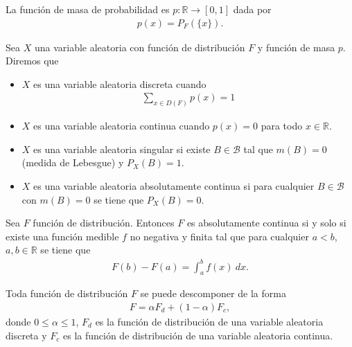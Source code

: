 \begin{defi}
    La función de masa de probabilidad es $p: \mathbb{R} \longrightarrow [0,1]$ dada por
    \begin{align*}
        p(x) = P_F(\{x\}).
    \end{align*}
\end{defi}

\begin{defi}
    Sea $X$ una variable aleatoria con función de distribución $F$ y función de masa $p$. Diremos que
    \begin{itemize}
        \item $X$ es una variable aleatoria discreta cuando
              \begin{align*}
                  \sum_{x \in D(F)} p(x) = 1
              \end{align*}
        \item $X$ es una variable aleatoria continua cuando $p(x) = 0$ para todo $x \in \mathbb{R}$.
        \item $X$ es una variable aleatoria singular si existe $B \in \mathcal{B}$ tal que $m(B) = 0$ (medida de Lebesgue) y $P_X(B) = 1$.
        \item $X$ es una variable aleatoria absolutamente continua si para cualquier $B \in \mathcal{B}$ con $m(B) = 0$ se tiene que $P_X(B) = 0$.
    \end{itemize}
\end{defi}

\begin{teo}
    Sea $F$ función de distribución. Entonces $F$ es absolutamente continua si y solo si existe una función medible $f$ no negativa y finita tal que para cualquier $a < b$, $a,b \in \mathbb{R}$ se tiene que
    \begin{align*}
        F(b) - F(a) = \int_{a}^{b} f(x) \ dx.
    \end{align*}
\end{teo}

\begin{teo}
    Toda función de distribución $F$ se puede descomponer de la forma
    \begin{align*}
        F = \alpha F_d + (1-\alpha)F_c,
    \end{align*}
    donde $0 \leq \alpha \leq 1$, $F_d$ es la función de distribución de una variable aleatoria discreta y $F_c$ es la función de distribución de una variable aleatoria continua.
\end{teo}

